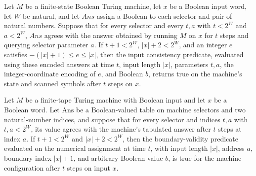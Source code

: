 \begin{theorem}
\label{Complexity.Meyer.inOK_true}
\leanok
{}
Let $M$ be a finite-state Boolean Turing machine, let $x$ be a Boolean input word, let
$W$ be natural, and let $Ans$ assign a Boolean to each selector and pair of natural
numbers. Suppose that for every selector and every $t,a$ with $t<2^W$ and $a<2^W$, $Ans$
agrees with the answer obtained by running $M$ on $x$ for $t$ steps and querying
selector parameter $a$. If $t+1<2^W$, $|x|+2<2^W$, and an integer $e$ satisfies
$-(|x|+1)\le e\le |x|$, then the input consistency predicate, evaluated using these
encoded answers at time $t$, input length $|x|$, parameters $t,a$, the
integer-coordinate encoding of $e$, and Boolean $b$, returns true on the machine's state
and scanned symbols after $t$ steps on $x$.
\end{theorem}

\begin{theorem}
\label{Complexity.Meyer.bdOK_true}
\leanok
{}
Let $M$ be a finite-tape Turing machine with Boolean input and let $x$ be a Boolean
word. Let $\mathrm{Ans}$ be a Boolean-valued table on machine selectors and two
natural-number indices, and suppose that for every selector and indices $t,a$ with
$t,a<2^W$, its value agrees with the machine's tabulated answer after $t$ steps at index
$a$. If $t+1<2^W$ and $|x|+2<2^W$, then the boundary-validity predicate evaluated on the
numerical assignment at time $t$, with input length $|x|$, address $a$, boundary index
$|x|+1$, and arbitrary Boolean value $b$, is true for the machine configuration after
$t$ steps on input $x$.
\end{theorem}


